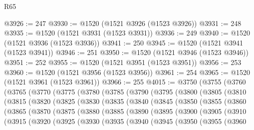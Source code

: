 \begin{lexlean}{R65}
\begin{coremodule}
{@3926 := 247
@3930 := @1520 (@1521 @3926 (@1523 @3926))
@3931 := 248
@3935 := @1520 (@1521 @3931 (@1523 @3931))
@3936 := 249
@3940 := @1520 (@1521 @3936 (@1523 @3936))
@3941 := 250
@3945 := @1520 (@1521 @3941 (@1523 @3941))
@3946 := 251
@3950 := @1520 (@1521 @3946 (@1523 @3946))
@3951 := 252
@3955 := @1520 (@1521 @3951 (@1523 @3951))
@3956 := 253
@3960 := @1520 (@1521 @3956 (@1523 @3956))
@3961 := 254
@3965 := @1520 (@1521 @3961 (@1523 @3961))
@3966 := 255
@4015 := @3750
    (@3755
      (@3760
        (@3765
          (@3770
            (@3775
              (@3780
                (@3785
                  (@3790
                    (@3795
                      (@3800
                        (@3805
                          (@3810
                            (@3815
                              (@3820
                                (@3825
                                  (@3830
                                    (@3835
                                      (@3840
                                        (@3845
                                          (@3850
                                            (@3855
                                              (@3860
                                                (@3865
                                                  (@3870
                                                    (@3875
                                                      (@3880
                                                        (@3885
                                                          (@3890
                                                            (@3895
                                                              (@3900
                                                                (@3905
                                                                  (@3910
                                                                    (@3915
                                                                      (@3920
                                                                        (@3925
                                                                          (@3930
                                                                            (@3935
                                                                              (@3940
                                                                                (@3945
                                                                                  (@3950
                                                                                    (@3955
                                                                                      (@3960
}
\end{coremodule}
\end{lexlean}
